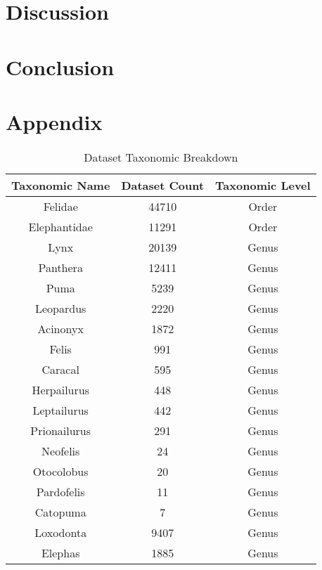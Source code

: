 \documentclass[conference]{IEEEtran}
\begin{document}
\section{Discussion}

\section{Conclusion}





\section{Appendix}

    \begin{table}[htbp]
        \caption{Dataset Taxonomic Breakdown}
        \begin{center}
        \begin{tabular}{|c|c|c|}
        \hline
        Taxonomic Name & Dataset Count & Taxonomic Level \\
        \hline
        Felidae & 44710 & Order \\
        Elephantidae & 11291 & Order \\
        \hline
        Lynx & 20139 & Genus \\
        Panthera & 12411 & Genus \\
        Puma & 5239 & Genus \\
        Leopardus & 2220 & Genus \\
        Acinonyx & 1872 & Genus \\
        Felis & 991 & Genus \\
        Caracal & 595 & Genus \\
        Herpailurus & 448 & Genus \\
        Leptailurus & 442 & Genus \\
        Prionailurus & 291 & Genus \\
        Neofelis & 24 & Genus \\
        Otocolobus & 20 & Genus \\
        Pardofelis & 11 & Genus \\
        Catopuma & 7 & Genus \\
        Loxodonta & 9407 & Genus \\
        Elephas & 1885 & Genus \\
        \hline
        \end{tabular}
        \label{table: taxonomic_breakdown}
        \end{center}
    \end{table}
\end{document}
